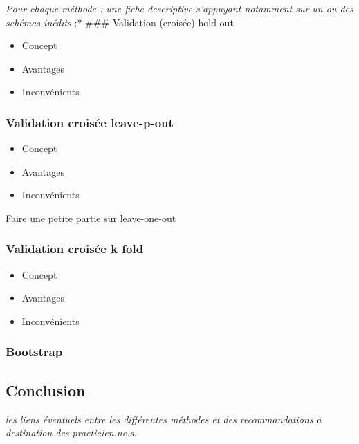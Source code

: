 \documentclass[]{article}
\providecommand{\tightlist}{%
  \setlength{\itemsep}{0pt}\setlength{\parskip}{0pt}}
\begin{document}
\emph{Pour chaque méthode : une fiche descriptive s'appuyant notamment
sur un ou des schémas inédits} ;* \#\#\# Validation (croisée) hold out

\begin{itemize}
\tightlist
\item
  Concept
\item
  Avantages
\item
  Inconvénients
\end{itemize}

\hypertarget{validation-croisuxe9e-leave-p-out}{%
\subsubsection{Validation croisée
leave-p-out}\label{validation-croisuxe9e-leave-p-out}}

\begin{itemize}
\tightlist
\item
  Concept
\item
  Avantages
\item
  Inconvénients
\end{itemize}

Faire une petite partie sur leave-one-out

\hypertarget{validation-croisuxe9e-k-fold}{%
\subsubsection{Validation croisée k
fold}\label{validation-croisuxe9e-k-fold}}

\begin{itemize}
\tightlist
\item
  Concept
\item
  Avantages
\item
  Inconvénients
\end{itemize}

\hypertarget{bootstrap}{%
\subsubsection{Bootstrap}\label{bootstrap}}

\hypertarget{conclusion}{%
\subsection{Conclusion}\label{conclusion}}

\emph{les liens éventuels entre les différentes méthodes et des
recommandations à destination des practicien.ne.s.}
\end{document}
